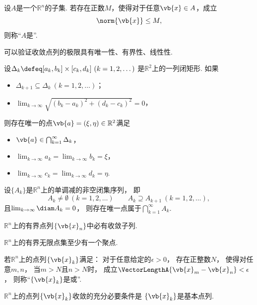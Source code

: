 \begin{definition}
设\(A\)是一个\(\mathbb{R}^n\)的子集.
若存在正数\(M\)，使得对于任意\(\vb{x} \in A\)，成立\begin{equation*}
	\norm{\vb{x}} \leq M,
\end{equation*}
则称“\(A\)是”.
\end{definition}
可以验证收敛点列的极限具有唯一性、有界性、线性性.

\begin{theorem}[闭矩形套定理]
设\(\Delta_k \defeq [a_k,b_k]\times[c_k,d_k]\ (k=1,2,\dotsc)\)
是\(\mathbb{R}^2\)上的一列闭矩形.
如果\begin{itemize}
	\item \(\Delta_{k+1} \subseteq \Delta_k\ (k=1,2,\dotsc)\)；
	\item \(\lim_{k\to\infty} \sqrt{(b_k-a_k)^2+(d_k-c_k)^2} = 0\)，
\end{itemize}
则存在唯一的点\(\vb{a}=(\xi,\eta)\in\mathbb{R}^2\)满足\begin{itemize}
	\item \(\vb{a}\in\bigcap_{k=1}^\infty \Delta_k\)，
	\item \(\lim_{k\to\infty} a_k = \lim_{k\to\infty} b_k = \xi\)，
	\item \(\lim_{k\to\infty} c_k = \lim_{k\to\infty} d_k = \eta\).
\end{itemize}
\end{theorem}
\begin{theorem}
设\(\{A_k\}\)是\(\mathbb{R}^n\)上的单调减的非空闭集序列，
即\begin{equation*}
	A_k\neq\emptyset\ (k=1,2,\dotsc)
	\qquad
	A_k \supseteq A_{k+1}\ (k=1,2,\dotsc),
\end{equation*}
且\(\lim_{k\to\infty} \diam A_k = 0\)，
则存在唯一点属于\(\bigcap_{k=1}^\infty A_k\).
\end{theorem}

\begin{theorem}
\(\mathbb{R}^n\)上的有界点列\(\{\vb{x}_n\}\)中必有收敛子列.
\end{theorem}
\begin{corollary}
\(\mathbb{R}^n\)上的有界无限点集至少有一个聚点.
\end{corollary}
\begin{definition}
若\(\mathbb{R}^n\)上的点列\(\{\vb{x}_k\}\)满足：
对于任意给定的\(\epsilon>0\)，
存在正整数\(N\)，
使得对任意\(m,n\)，
当\(m>N\)且\(n>N\)时，
成立\(\VectorLengthA{\vb{x}_m-\vb{x}_n}<\epsilon\)，
则称“\(\{\vb{x}_k\}\)是或”.
\end{definition}
\begin{theorem}
\(\mathbb{R}^n\)上的点列\(\{\vb{x}_k\}\)收敛的充分必要条件是
\(\{\vb{x}_k\}\)是基本点列.
\end{theorem}

